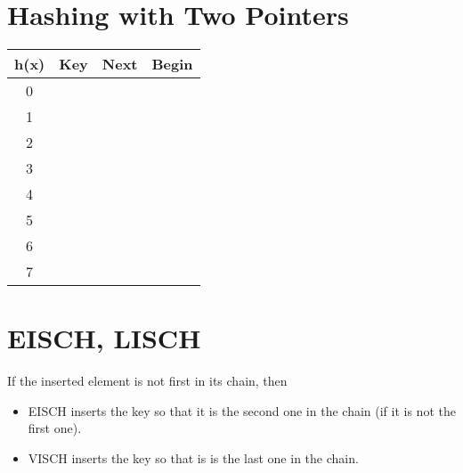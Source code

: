 \section*{Hashing with Two Pointers}
\begin{tabular}{|c|c|c|c|}
\hline
h(x) & Key & Next & Begin \\ \hline\hline
0 & \hspace{3cm} & \hspace{3cm} & \hspace{3cm} \\ \hline
1 & \hspace{3cm} & \hspace{3cm} & \hspace{3cm} \\ \hline
2 & \hspace{3cm} & \hspace{3cm} & \hspace{3cm} \\ \hline
3 & \hspace{3cm} & \hspace{3cm} & \hspace{3cm} \\ \hline
4 & \hspace{3cm} & \hspace{3cm} & \hspace{3cm} \\ \hline
5 & \hspace{3cm} & \hspace{3cm} & \hspace{3cm} \\ \hline
6 & \hspace{3cm} & \hspace{3cm} & \hspace{3cm} \\ \hline
7 & \hspace{3cm} & \hspace{3cm} & \hspace{3cm} \\ \hline
\end{tabular}

\section*{EISCH, LISCH}
If the inserted element is not first in its chain, then 
\begin{itemize}
\item EISCH inserts the key so that it is the second one in the chain (if it is not the first one).
\item VISCH inserts the key so that is is the last one in the chain.
\end{itemize}

